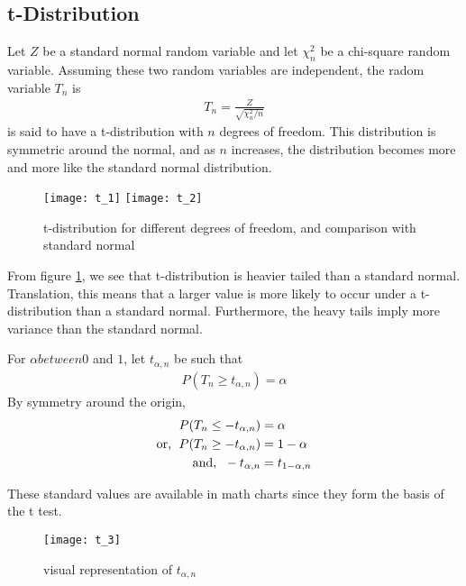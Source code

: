 \documentclass[../probability-notes.tex]{subfiles}
\begin{document}
    \subsection{t-Distribution}
    Let $Z$ be a standard normal random variable and let $\chi_{n}^{2}$ be a chi-square random variable. Assuming these two random variables are independent, the radom variable $T_{n}$ is
    \begin{align*}
        T_{n} = \frac{Z}{\sqrt{\chi_{n}^{2}/n}}
    \end{align*}
    is said to have a t-distribution with $n$ degrees of freedom.\newline
    This distribution is symmetric around the normal, and as $n$ increases, the distribution becomes more and more like the standard normal distribution.

    \begin{figure}[h]
    \texttt{[image: t\_1]}
    \texttt{[image: t\_2]}
    \centering
    \caption{t-distribution for different degrees of freedom, and comparison with standard normal}
    \label{fig:t_1} %
    \end{figure}

    From figure \ref{fig:t_1}, we see that t-distribution is heavier tailed than a standard normal. Translation, this means that a larger value is more likely to occur under a t-distribution than a standard normal. Furthermore, the heavy tails imply more variance than the standard normal.\newline

    For $\alpha between 0$ and $1$, let $t_{\alpha, n}$ be such that
    \begin{align*}
        P(T_{n} \geq t_{\alpha, n}) = \alpha
    \end{align*}
    By symmetry around the origin,
    \begin{align*}
        P(T_{n} \leq -t_{\alpha, n}) &= \alpha\\
        \text{or, \;} P(T_{n} \geq -t_{\alpha, n}) &= 1 - \alpha\\
        \text{and, \;} -t_{\alpha, n} &= t_{1 - \alpha, n}
    \end{align*}

    These standard values are available in math charts since they form the basis of the t test.

    \begin{figure}[h]
    \texttt{[image: t\_3]}
    \centering
    \caption{visual representation of $t_{\alpha,n}$}
    \label{fig:t_2} %
    \end{figure}
\end{document}
